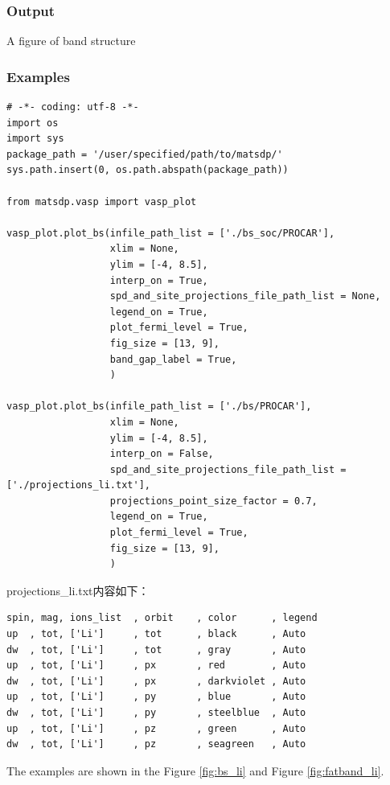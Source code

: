 \documentclass[12pt]{book}
\begin{document}
\subsubsection{Output}
A figure of band structure
\subsubsection{Examples}

\begin{lstlisting}[basicstyle=\small]
# -*- coding: utf-8 -*-
import os
import sys
package_path = '/user/specified/path/to/matsdp/'
sys.path.insert(0, os.path.abspath(package_path))

from matsdp.vasp import vasp_plot

vasp_plot.plot_bs(infile_path_list = ['./bs_soc/PROCAR'],
                  xlim = None,
                  ylim = [-4, 8.5],
                  interp_on = True,
                  spd_and_site_projections_file_path_list = None,
                  legend_on = True,
                  plot_fermi_level = True,
                  fig_size = [13, 9],
                  band_gap_label = True,
                  )

vasp_plot.plot_bs(infile_path_list = ['./bs/PROCAR'],
                  xlim = None,
                  ylim = [-4, 8.5],
                  interp_on = False,
                  spd_and_site_projections_file_path_list = ['./projections_li.txt'],
                  projections_point_size_factor = 0.7,
                  legend_on = True,
                  plot_fermi_level = True,
                  fig_size = [13, 9],
                  )
\end{lstlisting}
projections\_li.txt内容如下：
\begin{lstlisting}
spin, mag, ions_list  , orbit    , color      , legend
up  , tot, ['Li']     , tot      , black      , Auto
dw  , tot, ['Li']     , tot      , gray       , Auto
up  , tot, ['Li']     , px       , red        , Auto
dw  , tot, ['Li']     , px       , darkviolet , Auto
up  , tot, ['Li']     , py       , blue       , Auto
dw  , tot, ['Li']     , py       , steelblue  , Auto
up  , tot, ['Li']     , pz       , green      , Auto
dw  , tot, ['Li']     , pz       , seagreen   , Auto
\end{lstlisting}

The examples are shown in the Figure \ref{fig:bs_li} and Figure \ref{fig:fatband_li}.
\end{document}

